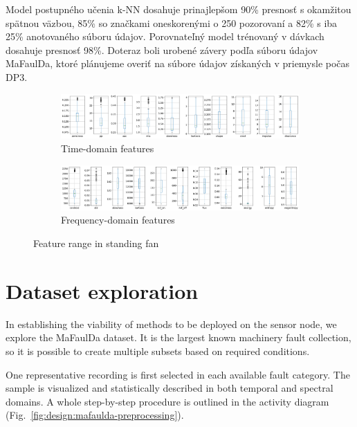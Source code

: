 Model postupného učenia k-NN dosahuje prinajlepšom 90\% presnosť s okamžitou spätnou väzbou, 85\% so značkami oneskorenými o 250 pozorovaní a 82\% s iba 25\% anotovaného súboru údajov. Porovnateľný model trénovaný v dávkach dosahuje presnosť 98\%.  Doteraz boli urobené závery podľa súboru údajov MaFaulDa, ktoré plánujeme overiť na súbore údajov získaných v priemysle počas DP3.

\begin{figure}[h]
    \centering
    \begin{subfigure}[b]{0.48\textwidth}
        \includegraphics[width=\textwidth]{assets/results/feature-values/fan-TD-features.png}
        \caption{Time-domain features}
    \end{subfigure}
    \hfill
    \begin{subfigure}[b]{0.48\textwidth}
        \includegraphics[width=\textwidth]{assets/results/feature-values/fan-FD-features.png}
        \caption{Frequency-domain features}
    \end{subfigure}
    \caption{Feature range in standing fan}
\end{figure}




\section{Dataset exploration}
In establishing the viability of methods to be deployed on the sensor node, we explore the MaFaulDa dataset. It is the largest known machinery fault collection, so it is possible to create multiple subsets based on required conditions. 

One representative recording is first selected in each available fault category. The sample is visualized and statistically described in both temporal and spectral domains. A whole step-by-step procedure is outlined in the activity diagram (Fig.~\ref{fig:design:mafaulda-preprocessing}).

